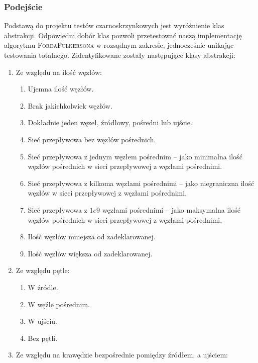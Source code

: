 \subsubsection{Podejście}
Podstawą do projektu testów czarno\dywiz skrzynkowych jest wyróżnienie klas
abstrakcji. Odpowiedni dobór klas pozwoli przetestować naszą implementację
algorytmu \textsc{Forda\dywiz Fulkersona} w rozsądnym zakresie, jednocześnie
unikając testowania totalnego. Zidentyfikowane zostały następujące klasy
abstrakcji:
\begin{enumerate}
    \item Ze względu na ilość węzłów:
        \begin{enumerate}
            \item Ujemna ilość węzłów.
            \item Brak jakichkolwiek węzłów.
            \item Dokładnie jeden węzeł, źródłowy, pośredni lub ujście.
            \item Sieć przepływowa bez węzłów pośrednich.
            \item Sieć przepływowa z jednym węzłem pośrednim -- jako minimalna
                ilość węzłów pośrednich w sieci przepływowej z węzłami
                pośrednimi.
            \item Sieć przepływowa z kilkoma węzłami pośrednimi -- jako
                niegraniczna ilość węzłów w sieci przepływowej z węzłami
                pośrednimi.
            \item Sieć przepływowa z $1e9$ węzłami pośrednimi -- jako maksymalna
                ilość węzłów pośrednich w sieci przepływowej z węzłami
                pośrednimi.
            \item Ilość węzłów mniejsza od zadeklarowanej.
            \item Ilość węzłów większa od zadeklarowanej.
        \end{enumerate}
    \item Ze względu pętle:
        \begin{enumerate}
            \item W źródle.
            \item W węźle pośrednim.
            \item W ujściu.
            \item Bez pętli.
        \end{enumerate}
    \item Ze względu na krawędzie bezpośrednie pomiędzy źródłem, a ujściem:
        \begin{enumerate}

\end{enumerate}
\end{enumerate}
